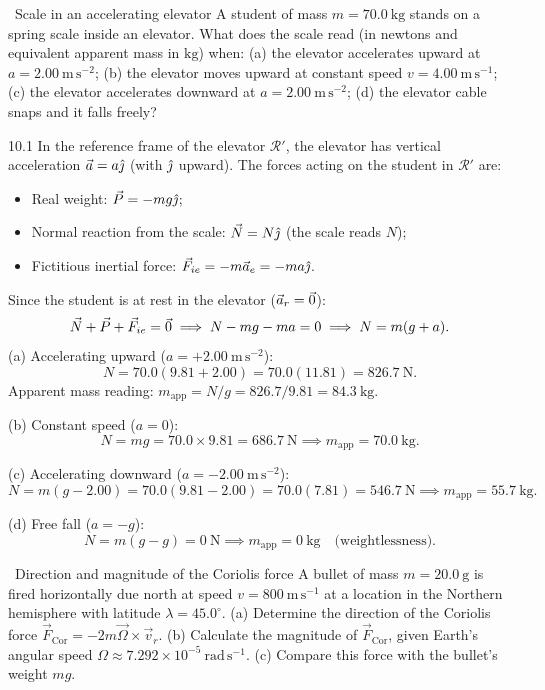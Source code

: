 \begin{exercise}{\warm\ Scale in an accelerating elevator}
A student of mass $m=70.0\ \mathrm{kg}$ stands on a spring scale inside an elevator. What does the scale read (in newtons and equivalent apparent mass in $\mathrm{kg}$) when:
(a) the elevator accelerates upward at $a=2.00\ \mathrm{m\,s^{-2}}$;
(b) the elevator moves upward at constant speed $v=4.00\ \mathrm{m\,s^{-1}}$;
(c) the elevator accelerates downward at $a=2.00\ \mathrm{m\,s^{-2}}$;
(d) the elevator cable snaps and it falls freely?
\end{exercise}

\begin{tabletworkspace}[5.5cm]
\end{tabletworkspace}

\begin{solution}{10.1}
In the reference frame of the elevator $\mathcal{R}'$, the elevator has vertical acceleration $\vec{a} = a\hat{\jmath}$ (with $\hat{\jmath}$ upward).
The forces acting on the student in $\mathcal{R}'$ are:
\begin{itemize}[leftmargin=1.4em,itemsep=2pt]
  \item Real weight: $\vec{P} = -mg\hat{\jmath}$;
  \item Normal reaction from the scale: $\vec{N} = N\hat{\jmath}$ (the scale reads $N$);
  \item Fictitious inertial force: $\vec{F}_{ie} = -m\vec{a}_e = -m a\hat{\jmath}$.
\end{itemize}
Since the student is at rest in the elevator ($\vec{a}_r = \vec{0}$):
\[
\vec{N} + \vec{P} + \vec{F}_{ie} = \vec{0} \implies N - mg - ma = 0 \implies N = m(g + a).
\]
(a) Accelerating upward ($a = +2.00\ \mathrm{m\,s^{-2}}$):
\[
N = 70.0(9.81 + 2.00) = 70.0(11.81) = 826.7\ \mathrm{N}.
\]
Apparent mass reading: $m_{\text{app}} = N/g = 826.7/9.81 = 84.3\ \mathrm{kg}$.

(b) Constant speed ($a = 0$):
\[
N = mg = 70.0\times 9.81 = 686.7\ \mathrm{N} \implies m_{\text{app}} = 70.0\ \mathrm{kg}.
\]

(c) Accelerating downward ($a = -2.00\ \mathrm{m\,s^{-2}}$):
\[
N = m(g - 2.00) = 70.0(9.81 - 2.00) = 70.0(7.81) = 546.7\ \mathrm{N} \implies m_{\text{app}} = 55.7\ \mathrm{kg}.
\]

(d) Free fall ($a = -g$):
\[
N = m(g - g) = 0\ \mathrm{N} \implies m_{\text{app}} = 0\ \mathrm{kg}\quad \text{(weightlessness)}.
\]
\end{solution}

\begin{exercise}{\warm\ Direction and magnitude of the Coriolis force}
A bullet of mass $m=20.0\ \mathrm{g}$ is fired horizontally due north at speed $v=800\ \mathrm{m\,s^{-1}}$ at a location in the Northern hemisphere with latitude $\lambda=45.0^\circ$.
(a) Determine the direction of the Coriolis force $\vec{F}_{\text{Cor}} = -2m\vec{\Omega}\times\vec{v}_r$.
(b) Calculate the magnitude of $\vec{F}_{\text{Cor}}$, given Earth's angular speed $\Omega \approx 7.292\times 10^{-5}\ \mathrm{rad\,s^{-1}}$.
(c) Compare this force with the bullet's weight $mg$.
\end{exercise}

